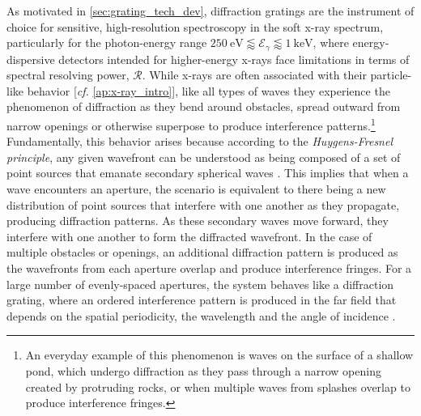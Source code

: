 \label{ap:grating_basics}
As motivated in \cref{sec:grating_tech_dev}, diffraction gratings are the instrument of choice for sensitive, high-resolution spectroscopy in the soft x-ray spectrum, particularly for the photon-energy range $\SI{250}{\electronvolt} \lessapprox \mathcal{E}_{\gamma} \lessapprox \SI{1}{\kilo\electronvolt}$, where energy-dispersive detectors intended for higher-energy x-rays face limitations in terms of spectral resolving power, $\mathscr{R}$. 
While x-rays are often associated with their particle-like behavior [\emph{cf.\@} \cref{ap:x-ray_intro}], like all types of waves they experience the phenomenon of diffraction as they bend around obstacles, spread outward from narrow openings or otherwise superpose to produce interference patterns.\footnote{An everyday example of this phenomenon is waves on the surface of a shallow pond, which undergo diffraction as they pass through a narrow opening created by protruding rocks, or when multiple waves from splashes overlap to produce interference fringes.} 
Fundamentally, this behavior arises because according to the \emph{Huygens-Fresnel principle}, any given wavefront can be understood as being composed of a set of point sources that emanate secondary spherical waves \cite{Born80}. 
This implies that when a wave encounters an aperture, the scenario is equivalent to there being a new distribution of point sources that interfere with one another as they propagate, producing diffraction patterns. 
As these secondary waves move forward, they interfere with one another to form the diffracted wavefront. 
In the case of multiple obstacles or openings, an additional diffraction pattern is produced as the wavefronts from each aperture overlap and produce interference fringes. 
For a large number of evenly-spaced apertures, the system behaves like a diffraction grating, where an ordered interference pattern is produced in the far field that depends on the spatial periodicity, the wavelength and the angle of incidence \cite{Loewen97}. 

